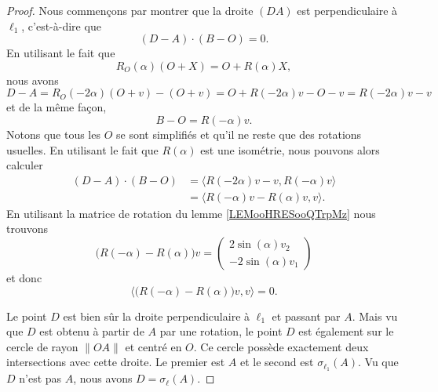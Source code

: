 \begin{proof}
    Nous commençons par montrer que la droite \( (DA)\) est perpendiculaire à \( \ell_1\), c'est-à-dire que
    \begin{equation}
        (D-A)\cdot (B-O)=0.
    \end{equation}
    En utilisant le fait que
    \begin{equation}
        R_O(\alpha)(O+X)=O+R(\alpha)X,
    \end{equation}
    nous avons
    \begin{equation}
        D-A=R_O(-2\alpha)(O+v)-(O+v)=O+R(-2\alpha)v-O-v=R(-2\alpha)v-v
    \end{equation}
    et de la même façon,
    \begin{equation}
        B-O=R(-\alpha)v.
    \end{equation}
    Notons que tous les \( O\) se sont simplifiés et qu'il ne reste que des rotations usuelles. En utilisant le fait que \( R(\alpha)\) est une isométrie, nous pouvons alors calculer
    \begin{subequations}
        \begin{align}
            (D-A)\cdot (B-O)&=\langle R(-2\alpha)v-v, R(-\alpha)v\rangle \\
            &=\langle R(-\alpha)v-R(\alpha)v, v\rangle.
        \end{align}
    \end{subequations}
    En utilisant la matrice de rotation du lemme \ref{LEMooHRESooQTrpMz} nous trouvons
    \begin{equation}
        \big( R(-\alpha)-R(\alpha) \big)v=\begin{pmatrix}
            2\sin(\alpha)v_2    \\
            -2\sin(\alpha)v_1
        \end{pmatrix}
    \end{equation}
    et donc
    \begin{equation}
        \langle  \big( R(-\alpha)-R(\alpha) \big)v  , v\rangle =0.
    \end{equation}

    Le point \( D\) est bien sûr la droite perpendiculaire à \( \ell_1\) et passant par \( A\). Mais vu que \( D\) est obtenu à partir de \( A\) par une rotation, le point \( D\) est également sur le cercle de rayon \( \| OA \|\) et centré en \( O\). Ce cercle possède exactement deux intersections avec cette droite. Le premier est \( A\) et le second est \( \sigma_{\ell_1}(A)\). Vu que \( D\) n'est pas \( A\), nous avons \( D=\sigma_{\ell}(A)\).
\end{proof}

